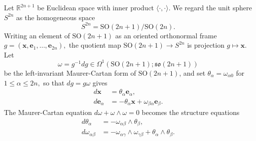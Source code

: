 \documentclass[11pt]{article}
\theoremstyle{definition}
\newcommand{\R}{\mathbb{R}}
\newcommand{\SO}{\mathrm{SO}}
\numberwithin{equation}{section}
\begin{document}
\indent \indent Let $\R^{2n+1}$ be Euclidean space with inner product $\langle \cdot, \cdot \rangle.$ We regard the unit sphere $S^{2n}$ as the homogeneous space
\begin{equation*}
	S^{2n} = \SO(2n+1) / \SO(2n).
\end{equation*}
Writing an element of $\SO(2n+1)$ as an oriented orthonormal frame $g = (\mathbf{x}, \mathbf{e}_1, \ldots, \mathbf{e}_{2n}),$ the quotient map $\SO(2n+1) \to S^{2n}$ is projection $g \mapsto \mathbf{x}.$ Let
\begin{equation*}
	\omega = g^{-1} d g \in \Omega^1(\SO(2n+1);\mathfrak{so}(2n+1))
\end{equation*}
be the left-invariant Maurer-Cartan form of $\SO(2n+1)$, and set $\theta_{\alpha} = \omega_{\alpha 0}$ for $1 \leq \alpha \leq 2n,$ so that $dg = g\omega$ gives
\begin{equation}\label{eq:frameeqsR}
	\begin{aligned}
		d \mathbf{x}          & = \theta_{\alpha} \mathbf{e}_{\alpha},                                   \\
		d \mathbf{e}_{\alpha} & = - \theta_{\alpha} \mathbf{x} + \omega_{\beta \alpha} \mathbf{e}_\beta. 
	\end{aligned}
\end{equation}
The Maurer-Cartan equation $d \omega + \omega \wedge \omega = 0$ becomes the structure equations
\begin{equation}\label{eq:structeqsR}
	\begin{aligned}
		d \theta_{\alpha}       & = -\omega_{\alpha \beta} \wedge \theta_{\beta},                                                  \\
		d \omega_{\alpha \beta} & = - \omega_{\alpha \gamma} \wedge \omega_{\gamma \beta} + \theta_{\alpha} \wedge \theta_{\beta}. 
	\end{aligned}
\end{equation}
	
\end{document}
